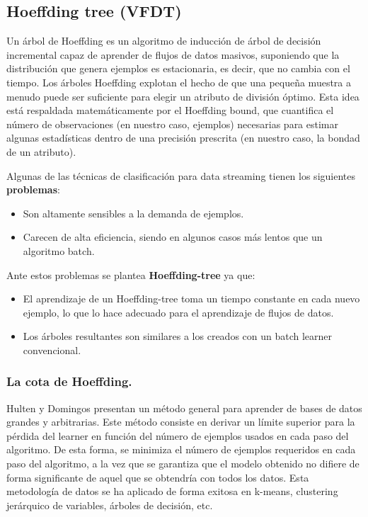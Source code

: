 \subsection{Hoeffding tree (VFDT)}

Un árbol de Hoeffding es un algoritmo de inducción de árbol de decisión incremental capaz de aprender de flujos de datos masivos, suponiendo que la distribución que genera ejemplos es estacionaria, es decir, que no cambia con el tiempo. Los árboles Hoeffding explotan el hecho de que una pequeña muestra a menudo puede ser suficiente para elegir un atributo de división óptimo. Esta idea está respaldada matemáticamente por el Hoeffding bound, que cuantifica el número de observaciones (en nuestro caso, ejemplos) necesarias para estimar algunas estadísticas dentro de una precisión prescrita (en nuestro caso, la bondad de un atributo). \cite{ref9}

Algunas de las técnicas de clasificación para data streaming tienen los siguientes \textbf{problemas}:
\begin{itemize}
	\item Son altamente sensibles a la demanda de ejemplos.
	\item Carecen de alta eficiencia, siendo en algunos casos más lentos que un algoritmo batch.
\end{itemize}

Ante estos problemas se plantea\textbf{ Hoeffding-tree} ya que:
\begin{itemize}
	\item El aprendizaje de un Hoeffding-tree toma un tiempo constante en cada nuevo ejemplo, lo que lo hace adecuado para el aprendizaje de flujos de datos.
	\item Los árboles resultantes son similares a los creados con un batch learner convencional.
\end{itemize}

\subsubsection{La cota de Hoeffding.}

Hulten y Domingos presentan un método general para aprender de bases de datos grandes y arbitrarias.
Este método consiste en derivar un límite superior para la pérdida del learner en función del número de ejemplos usados en cada paso del algoritmo. De esta forma, se minimiza el número de ejemplos requeridos en cada paso del algoritmo, a la vez que se garantiza que el modelo obtenido no difiere de forma significante de aquel que se obtendría con todos los datos. Esta metodología de datos se ha aplicado de forma exitosa en k-means, clustering jerárquico de variables, árboles de decisión, etc.

